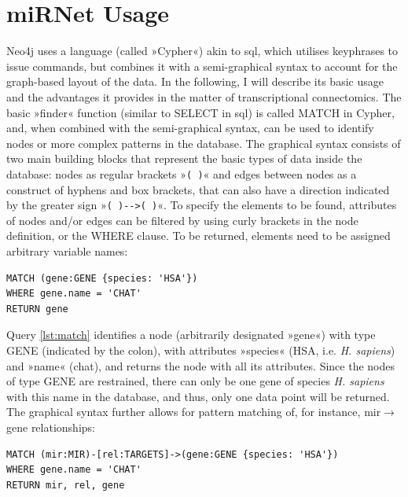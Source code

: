 
\section{miRNet Usage}
Neo4j uses a language (called »Cypher«) akin to \ac{sql}, which utilises keyphrases to issue commands, but combines it with a semi-graphical syntax to account for the graph-based layout of the data. In the following, I will describe its basic usage and the advantages it provides in the matter of transcriptional connectomics. The basic »finder« function (similar to \textcolor{dkblue}{SELECT} in \ac{sql}) is called \textcolor{dkblue}{MATCH} in Cypher, and, when combined with the semi-graphical syntax, can be used to identify nodes or more complex patterns in the database. The graphical syntax consists of two main building blocks that represent the basic types of data inside the database: nodes as regular brackets »\texttt{( )}« and edges between nodes as  a construct of hyphens and box brackets, that can also have a direction indicated by the greater sign \mbox{»\texttt{( )-\string[ \string]->( )}«}. To specify the elements to be found, attributes of nodes and/or edges can be filtered by using curly brackets in the node definition, or the \textcolor{dkblue}{WHERE} clause. To be returned, elements need to be assigned arbitrary variable names:

\begin{lstlisting}[label=lst:match, caption=MATCH, language=Cypher]
MATCH (gene:GENE {species: 'HSA'})
WHERE gene.name = 'CHAT'
RETURN gene
\end{lstlisting}

Query \ref{lst:match} identifies a node (arbitrarily designated »gene«) with type GENE (indicated by the colon), with attributes »species« (HSA, i.e. \textit{H. sapiens}) and »name« (\ac{chat}), and returns the node with all its attributes. Since the nodes of type GENE are restrained, there can only be one gene of species \textit{H. sapiens} with this name in the database, and thus, only one data point will be returned. The graphical syntax further allows for pattern matching of, for instance, \ac{mir}$\to$gene relationships:

\begin{lstlisting}[label=lst:pattern,caption=Patterns,
language=Cypher]
MATCH (mir:MIR)-[rel:TARGETS]->(gene:GENE {species: 'HSA'})
WHERE gene.name = 'CHAT'
RETURN mir, rel, gene
\end{lstlisting}

